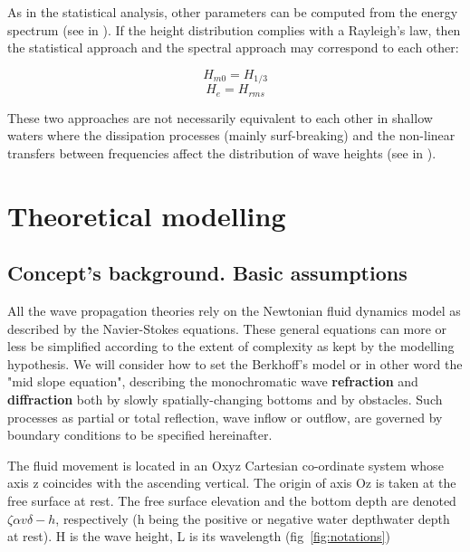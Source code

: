As in the statistical analysis, other parameters can be computed from the
energy spectrum (see in \cite{SeaState}). If the height distribution
complies with a Rayleigh's law, then the statistical approach and the spectral
approach may correspond to each other:

$$ H_{m0} = H_{1/3} $$
$$ H_{e} = H_{rms} $$

These two approaches are not necessarily equivalent to each other in shallow
waters where the dissipation processes (mainly surf-breaking) and the
non-linear transfers between frequencies affect the distribution of wave
heights (see in \cite{Hamm1995}).


\section{Theoretical modelling}


\subsection{Concept's background. Basic assumptions}

All the wave propagation theories rely on the Newtonian fluid dynamics model as
described by the Navier-Stokes equations. These general equations can more
or less be simplified according to the extent of complexity as kept by the
modelling hypothesis. We will consider how to set the Berkhoff's model
\cite{berkhoff1976} or in other word the "mid slope equation", describing the
monochromatic wave \textbf{refraction} and \textbf{diffraction} both by slowly
spatially-changing bottoms and by obstacles. Such processes as partial or total
reflection, wave inflow or outflow, are governed by boundary conditions to be
specified hereinafter.

The fluid movement is located in an Oxyz Cartesian co-ordinate system whose
axis z coincides with the ascending vertical. The origin of axis Oz is taken at
the free surface at rest. The free surface elevation and the bottom depth are
denoted $\zeta\alpha{v}\delta-h$, respectively (h being the positive or negative water
depthwater depth at rest). H is the wave height, L is its wavelength
(fig~\ref{fig:notations})

